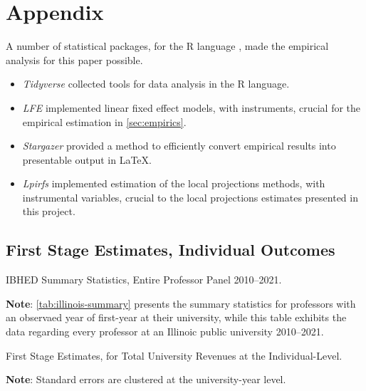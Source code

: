 \documentclass[notitlepage,12pt]{article}
\begin{document}
\section{Appendix}
\label{appendix}
A number of statistical packages, for the R language \citep{R2022}, made the empirical analysis for this paper possible.
\begin{itemize}
    \item \textit{Tidyverse} \citep{tidyverse} collected tools for data analysis in the R language.
    \item \textit{LFE} \citep{lfe} implemented linear fixed effect models, with instruments, crucial for the empirical estimation in \autoref{sec:empirics}.
    \item \textit{Stargazer} \citep{stargazer} provided a method to efficiently convert empirical results into presentable output in \LaTeX.
    \item \textit{Lpirfs} \citep{lpirfs2019} implemented estimation of the \cite{jorda2005} local projections methods, with instrumental variables, crucial to the local projections estimates presented in this project.
\end{itemize}

\subsection{First Stage Estimates, Individual Outcomes}
\label{appendix:part1}

\begin{table}[h!]
    \onehalfspacing
    \centering
    \caption{IBHED Summary Statistics, Entire Professor Panel 2010--2021.}
    \makebox[\textwidth][c]{}
    \label{tab:illinois-summary-entire}
    \begin{flushleft}
        \footnotesize
        \textbf{Note}: \autoref{tab:illinois-summary} presents the summary statistics for professors with an observaed year of first-year at their university, while this table exhibits the data regarding every professor at an Illinoic public university 2010--2021.
    \end{flushleft}
\end{table}

\begin{table}[H]
    \onehalfspacing
    \centering
    \caption{First Stage Estimates, for Total University Revenues at the Individual-Level.}
    \makebox[\textwidth][c]{}
    \label{tab:firststage-illinois}
    \begin{flushleft}
        \footnotesize
        \textbf{Note}: Standard errors are clustered at the university-year level.
    \end{flushleft}
\end{table}
\end{document}
